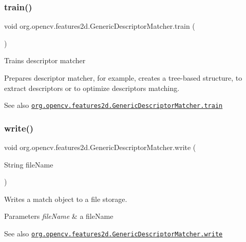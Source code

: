 \subsubsection{\texorpdfstring{train()}{train()}}
{\footnotesize\ttfamily void org.\+opencv.\+features2d.\+Generic\+Descriptor\+Matcher.\+train (\begin{DoxyParamCaption}{ }\end{DoxyParamCaption})}

Trains descriptor matcher

Prepares descriptor matcher, for example, creates a tree-\/based structure, to extract descriptors or to optimize descriptors matching.

\begin{DoxySeeAlso}{See also}
\href{http://docs.opencv.org/modules/features2d/doc/common_interfaces_of_generic_descriptor_matchers.html#genericdescriptormatcher-train}{\tt org.\+opencv.\+features2d.\+Generic\+Descriptor\+Matcher.\+train} 
\end{DoxySeeAlso}
\mbox{\label{classorg_1_1opencv_1_1features2d_1_1_generic_descriptor_matcher_afe6a58bb4c1210dd0701d0514fa58d5a}} 
\subsubsection{\texorpdfstring{write()}{write()}}
{\footnotesize\ttfamily void org.\+opencv.\+features2d.\+Generic\+Descriptor\+Matcher.\+write (\begin{DoxyParamCaption}\item[{String}]{file\+Name }\end{DoxyParamCaption})}

Writes a match object to a file storage.


\begin{DoxyParams}{Parameters}
{\em file\+Name} & a file\+Name\\
\hline
\end{DoxyParams}
\begin{DoxySeeAlso}{See also}
\href{http://docs.opencv.org/modules/features2d/doc/common_interfaces_of_generic_descriptor_matchers.html#genericdescriptormatcher-write}{\tt org.\+opencv.\+features2d.\+Generic\+Descriptor\+Matcher.\+write} 
\end{DoxySeeAlso}


